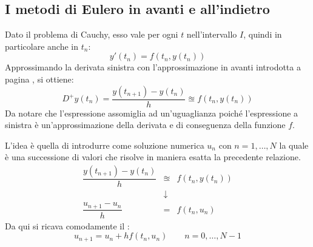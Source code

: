 \subsection{I metodi di Eulero in avanti e all'indietro}

Dato il problema di Cauchy, esso vale per ogni $t$ nell'intervallo $I$, quindi in particolare anche in $t_{n}$:
\begin{equation*}
	y'\left(t_{n}\right) = f\left(t_{n}, y\left(t_{n}\right)\right)
\end{equation*}
Approssimando la derivata sinistra con l'approssimazione in avanti introdotta a pagina \pageref{eq: approssimazione in avanti della derivata prima}, si ottiene:
\begin{equation*}
	D^{+} y\left(t_{n}\right) = \dfrac{y\left(t_{n+1}\right) - y\left(t_{n}\right)}{h} \approxeq f\left(t_{n}, y\left(t_{n}\right)\right)
\end{equation*}
Da notare che l'espressione assomiglia ad un'uguaglianza poiché l'espressione a sinistra è un'approssimazione della derivata e di conseguenza della funzione $f$.

\highspace
L'idea è quella di introdurre come soluzione numerica $u_{n}$ con $n = 1, \dots, N$ la quale è una successione di valori che risolve in maniera esatta la precedente relazione.
\begin{equation*}
	\begin{array}{rcl}
		\dfrac{y\left(t_{n+1}\right) - y\left(t_{n}\right)}{h} &\approxeq& f\left(t_{n}, y\left(t_{n}\right)\right) \\ [1em]
		&\downarrow& \\ [.5em]
		\dfrac{
			u_{n+1} - u_{n}
		}{h} &=& f\left(t_{n}, u_{n}\right)
	\end{array}
\end{equation*}
Da qui si ricava comodamente il :
\begin{equation}\label{eq: metodo di Eulero in avanti}
	u_{n+1} = u_{n} + hf\left(t_{n}, u_{n}\right) \hspace{2em} n = 0, \dots, N - 1
\end{equation}

